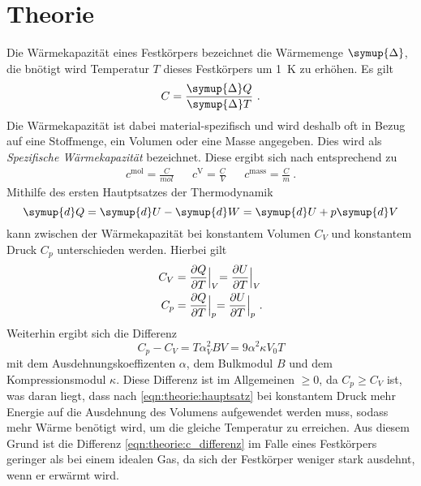 \section{Theorie}
\label{sec:theorie}

    Die Wärmekapazität eines Festkörpers bezeichnet die Wärmemenge $\symup{\Delta}$,
    die bnötigt wird Temperatur $T$ dieses Festkörpers um \SI{1}{\kelvin} zu erhöhen.
    Es gilt
    \begin{equation*}
        C = \frac{\symup{\Delta}Q}{\symup{\Delta}T} \ .
    \end{equation*}
    Die Wärmekapazität ist dabei material-spezifisch und wird deshalb oft in Bezug auf eine Stoffmenge,
    ein Volumen oder eine Masse angegeben.
    Dies wird als \textit{Spezifische Wärmekapazität} bezeichnet.
    Diese ergibt sich nach \cite{grossmarx} entsprechend zu
    \begin{align}
        c^\text{mol} = \frac{C}{mol} && c^\text{V} = \frac{C}{V} && c^\text{mass} = \frac{C}{m} \ .
    \end{align}
    Mithilfe des ersten Hautptsatzes der Thermodynamik
    \begin{equation}
        \symup{d}Q = \symup{d}U - \symup{d}W = \symup{d}U + p\symup{d}V
        \label{eqn:theorie:hauptsatz}
    \end{equation}
    kann zwischen der Wärmekapazität bei konstantem Volumen $C_V$ und konstantem Druck $C_p$ unterschieden werden.
    Hierbei gilt
    \begin{align}
        C_V &= \frac{\partial Q}{\partial T} \Bigl|_V = \frac{\partial U}{\partial T} \Bigl|_V
        \label{eqn:theorie:c_vconst} \\
        C_p &= \frac{\partial Q}{\partial T} \Bigl|_p = \frac{\partial U}{\partial T} \Bigl|_p
        \label{eqn:theorie:c_pconst} \ .
    \end{align}
    Weiterhin ergibt sich die Differenz
    \begin{equation}
        C_p - C_V = T \alpha^2_V B V = 9 \alpha^2 \kappa V_0 T
        \label{eqn:theorie:c_differenz}
    \end{equation}
    mit dem Ausdehnungskoeffizenten $\alpha$,
    dem Bulkmodul $B$ und dem Kompressionsmodul $\kappa$.
    Diese Differenz ist im Allgemeinen $\geq 0$,
    da $C_p \geq C_V$ ist,
    was daran liegt,
    dass nach \autoref{eqn:theorie:hauptsatz} bei konstantem Druck mehr Energie auf die Ausdehnung des Volumens aufgewendet werden muss,
    sodass mehr Wärme benötigt wird,
    um die gleiche Temperatur zu erreichen.
    Aus diesem Grund ist die Differenz \autoref{eqn:theorie:c_differenz} im Falle eines Festkörpers geringer als bei einem idealen Gas,
    da sich der Festkörper weniger stark ausdehnt,
    wenn er erwärmt wird.

